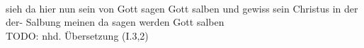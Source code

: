 \begin{exe}
\ex \label{ex:I838} \gll {}                          \\
{sieh da} {hier} {nun} {sein} {von} {Gott} {sagen} {Gott} {salben} {} {und} {gewiss} {sein} {Christus} {in} {der} {der-} {Salbung} {meinen} {} {da} {sagen} {werden} {Gott} {salben} {}\\
\glt TODO: nhd. Übersetzung (I.3,2)
\end{exe}
